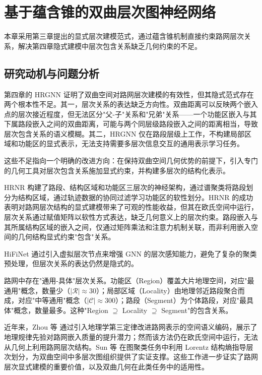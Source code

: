 \chapter{基于蕴含锥的双曲层次图神经网络}

本章采用第三章提出的显式层次建模范式，通过蕴含锥机制直接约束路网层次关系，解决第四章隐式建模中层次包含关系缺乏几何约束的不足。

\section{研究动机与问题分析}

第四章的 HRGNN 证明了双曲空间对路网层次建模的有效性，但其隐式范式存在两个根本性不足。其一，层次关系的表达缺乏方向性。双曲距离可以反映两个嵌入点的层次接近程度，但无法区分"父-子"关系和"兄弟"关系——一个功能区嵌入与其下属路段嵌入之间的双曲距离，可能与两个同层级路段嵌入之间的距离相当，导致层次包含关系的语义模糊。其二，HRGNN 仅在路段层级上工作，不构建局部区域和功能区的显式表示，无法支持需要多层次信息交互的通用表示学习任务。

这些不足指向一个明确的改进方向：在保持双曲空间几何优势的前提下，引入专门的几何工具对层次包含关系施加显式约束，并构建多层次的结构化表示。

HRNR\cite{wu2020hrnr} 构建了路段、结构区域和功能区三层次的神经架构，通过谱聚类将路段划分为结构区域，通过轨迹数据的协同过滤学习功能区的软性划分。HRNR 的成功表明对路网层次结构的显式建模带来了可观的性能收益，但其在欧氏空间中运行，层次关系通过赋值矩阵以软性方式表达，缺乏几何意义上的层次约束。路段嵌入与其所属结构区域的嵌入之间，仅通过矩阵乘法和注意力机制关联，而非利用嵌入空间的几何结构显式约束"包含"关系。

HiFiNet 通过引入虚拟层次节点来增强 GNN 的层次感知能力，避免了复杂的聚类预处理，但层次关系的表达仍然是隐式的。

路网中存在"通用-具体"层次关系。功能区（Region）覆盖大片地理空间，对应"最通用"概念，数量少（$|\mathcal{R}| \approx 30$）；局部区域（Locality）由地理邻近路段聚合而成，对应"中等通用"概念（$|\mathcal{C}| \approx 300$）；路段（Segment）为个体路段，对应"最具体"概念，数量最多。这种"Region $\supseteq$ Locality $\supseteq$ Segment"的包含关系。

近年来，Zhou 等\cite{zhou2024garner} 通过引入地理学第三定律改进路网表示的空间语义编码，展示了地理规律先验对路网嵌入质量的提升潜力；然而该方法仍在欧氏空间中运行，无法从几何上利用路网层次结构。Sun 等\cite{sun2024lsenet} 在图聚类任务中利用 Lorentz 结构熵指导层次划分，为双曲空间中多层次图组织提供了实证支撑。这些工作进一步证实了路网层次显式建模的重要价值，以及双曲几何在此类任务中的适用性。

